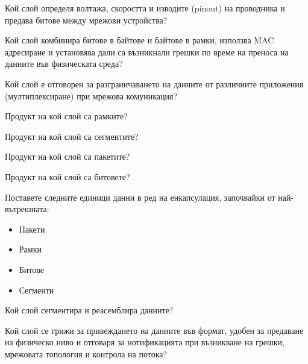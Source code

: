 \begin{q}
  Кой слой определя волтажа, скоростта и изводите (pinout) на проводника и
  предава битове между мрежови устройства?
\end{q}

\begin{q}
  Кой слой комбинира битове в байтове и байтове в рамки, използва MAC адресиране
  и установява дали са възникнали грешки по време на преноса на данните във
  физическата среда?
\end{q}

\begin{q}
  Кой слой е отговорен за разграничаването на данните от различните приложения
  (мултиплексиране) при мрежова комуникация?
\end{q}

\begin{q}
  Продукт на кой слой са рамките?
\end{q}

\begin{q}
  Продукт на кой слой са сегментите?
\end{q}

\begin{q}
  Продукт на кой слой са пакетите?
\end{q}

\begin{q}
  Продукт на кой слой са битовете?
\end{q}

\begin{q}
  Поставете следните единици данни в ред на енкапсулация, започвайки от
  най-вътрешната:

  \begin{itemize}
  \item Пакети
  \item Рамки
  \item Битове
  \item Сегменти
  \end{itemize}
\end{q}

\begin{q}
  Кой слой сегментира и реасемблира данните?
\end{q}

\begin{q}
  Кой слой се грижи за привеждането на данните във формат, удобен за предаване
  на физическо ниво и отговаря за нотификацията при възникване на грешки,
  мрежовата топология и контрола на потока?
\end{q}

